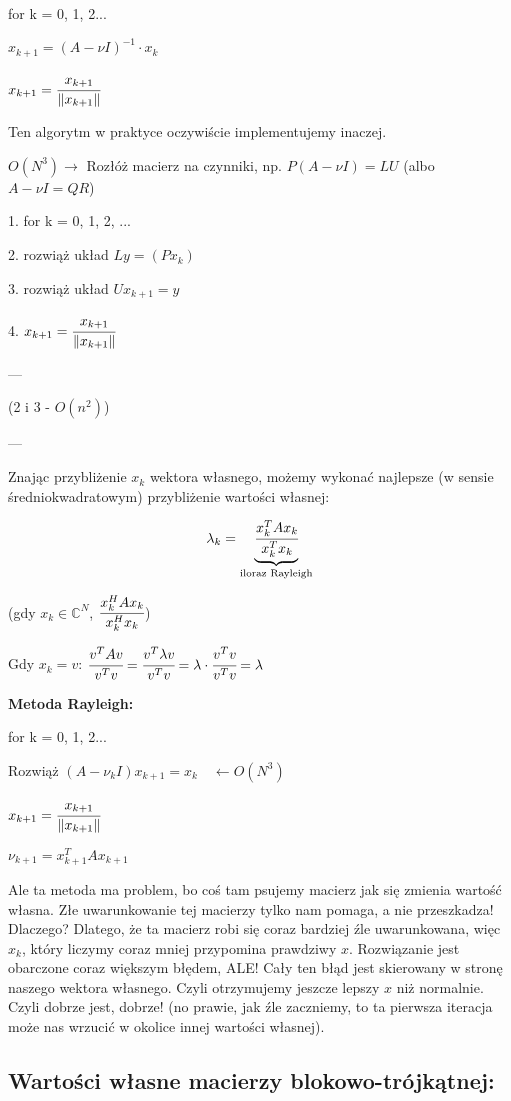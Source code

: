 \documentclass[hidelinks,a4paper,fleqn]{article}
\newcommand{\CC}{\mathbb{C}}
\newcommand{\ra}{\rightarrow}
\newcommand{\la}{\leftarrow}
\newcommand{\norm}[1]{\left\lVert#1\right\rVert}
\begin{document}
for k = 0, 1, 2...
 
$x_{k+1} = (A - \nu I)^{-1}\cdot x_k$
 
$x_{k+1} = \cfrac{x_{k+1}}{\norm{x_{k+1}}}$


Ten algorytm w praktyce oczywiście implementujemy inaczej.

$O(N^3) \ra $ Rozłóż macierz na czynniki, np. $P(A-\nu I) = LU$ (albo $A - \nu I = QR$)

1. for k = 0, 1, 2, ... 

2. rozwiąż układ $Ly = (Px_k)$

3. rozwiąż układ $U x_{k+1} = y$

4. $x_{k+1} = \cfrac{x_{k+1}}{\norm{x_{k+1}}}$

---

(2 i 3 - $O(n^2)$)

---

Znając przybliżenie $x_k$ wektora własnego, możemy wykonać najlepsze (w sensie średniokwadratowym) przybliżenie wartości własnej:

\[
	\lambda_k = \underbrace{\cfrac{x^T_k A x_k}{x_k^T x_k}}_{\textrm{iloraz Rayleigh}}
\]

(gdy $x_k \in \CC^N$, $\cfrac{x_k^H A x_k}{x_k^Hx_k}$)

Gdy $x_k = v$: $\cfrac{v^TAv}{v^Tv} = \cfrac{v^T \lambda v}{v^T v} = \lambda \cdot \cfrac{v^T v}{v^T v} = \lambda$


\textbf{Metoda Rayleigh:}

for k = 0, 1, 2...

Rozwiąż $(A - \nu_k I)x_{k+1} = x_k \quad \la O(N^3)$
 
$x_{k+1} = \cfrac{x_{k+1}}{\norm{x_{k+1}}}$

$\nu_{k+1} = x_{k+1}^T A x_{k+1}$
 
Ale ta metoda ma problem, bo coś tam psujemy macierz jak się zmienia wartość własna. Złe uwarunkowanie tej macierzy tylko nam pomaga, a nie przeszkadza! Dlaczego? Dlatego, że ta macierz robi się coraz bardziej źle uwarunkowana, więc $x_k$, który liczymy coraz mniej przypomina prawdziwy $x$. Rozwiązanie jest obarczone coraz większym błędem, ALE! Cały ten błąd jest skierowany w stronę naszego wektora własnego. Czyli otrzymujemy jeszcze lepszy $x$ niż normalnie. Czyli dobrze jest, dobrze! (no prawie, jak źle zaczniemy, to ta pierwsza iteracja może nas wrzucić w okolice innej wartości własnej). 


\subsection{Wartości własne macierzy blokowo-trójkątnej:}
\end{document}
